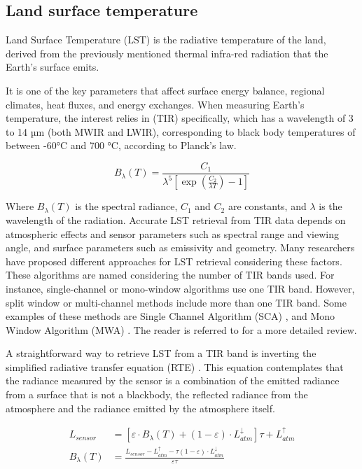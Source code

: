    \subsection{Land surface temperature}


        Land Surface Temperature (LST) is the radiative temperature of the land, derived from the previously mentioned thermal infra-red radiation that the Earth’s surface emits.

        It is one of the key parameters that affect surface energy balance, regional climates, heat fluxes, and energy exchanges.
        When measuring Earth’s temperature, the interest relies in (TIR) specifically, which has a wavelength of 3 to 14 µm (both MWIR and LWIR), corresponding to black body temperatures of between -60°C and 700 °C, according to Planck’s law.

        \begin{equation}
            B_{\lambda}(T) = \frac{C_1}{\lambda^5 \left[ \exp\left(\frac{C_2}{\lambda T}\right) - 1\right]}
        \end{equation}

        Where $B_{\lambda}(T)$ is the spectral radiance, $C_1$ and $C_2$ are constants, and $\lambda$ is the wavelength of the radiation. 
        Accurate LST retrieval from TIR data depends on atmospheric effects and sensor parameters such as spectral range and viewing angle, and surface parameters such as emissivity and geometry. Many researchers have proposed different approaches for LST retrieval considering these factors.
        These algorithms are named considering the number of TIR bands used. For instance, single-channel or mono-window algorithms use one TIR band. However, split window or multi-channel methods include more than one TIR band. Some examples of these methods are Single Channel Algorithm (SCA) \cite{sca2009}, and Mono Window Algorithm (MWA) \cite{mwa2001}. The reader is referred to \cite{LI201314} for a more detailed review.


        A straightforward way to retrieve LST from a TIR band is inverting the simplified radiative transfer equation (RTE) \cite{becker90}. This equation contemplates that the radiance measured by the sensor is a combination of the emitted radiance from a surface that is not a blackbody, the reflected radiance from the atmosphere and the radiance emitted by the atmosphere itself.


        \begin{equation}
            \begin{aligned}
            L_{sensor} &= \left[ \varepsilon \cdot B_{\lambda}(T) + (1 - \varepsilon) \cdot L_{atm}^{\downarrow} \right] \tau + L_{atm}^{\uparrow} \\
            B_\lambda (T) &= \frac{L_{sensor} - L_{atm}^{\uparrow}- \tau (1 - \varepsilon) \cdot L_{atm}^{\downarrow}}{\varepsilon \tau} 
            \end{aligned}
        \end{equation}

